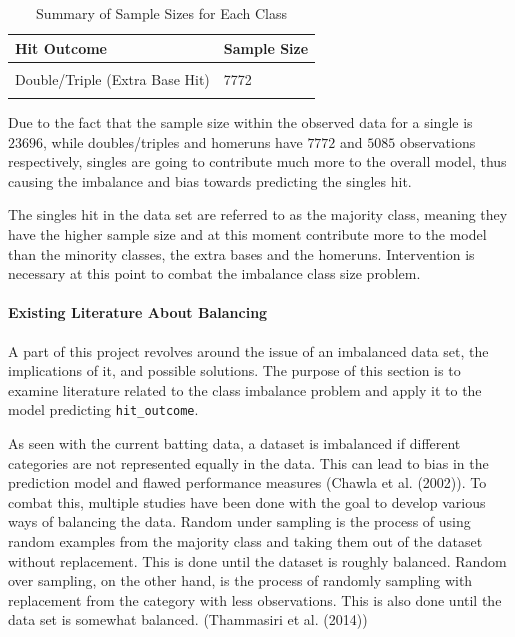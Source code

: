 \documentclass[
  letterpaper,
  DIV=11,
  numbers=noendperiod]{scrartcl}
\let\oldparagraph\paragraph
\renewcommand{\paragraph}[1]{\oldparagraph{#1}\mbox{}}
\begin{document}
\begin{table}[!h]
\centering
\caption{\label{tab:unnamed-chunk-39}Summary of Sample Sizes for Each Class}
\centering
\begin{tabular}[t]{ll}
\toprule
Hit Outcome & Sample Size\\
\midrule
\cellcolor{gray!10}{Single} & \cellcolor{gray!10}{23696}\\
Double/Triple (Extra Base Hit) & 7772\\
\cellcolor{gray!10}{Homerun} & \cellcolor{gray!10}{5085}\\
\bottomrule
\end{tabular}
\end{table}

Due to the fact that the sample size within the observed data for a
single is \(23696\), while doubles/triples and homeruns have \(7772\)
and \(5085\) observations respectively, singles are going to contribute
much more to the overall model, thus causing the imbalance and bias
towards predicting the singles hit.

The singles hit in the data set are referred to as the majority class,
meaning they have the higher sample size and at this moment contribute
more to the model than the minority classes, the extra bases and the
homeruns. Intervention is necessary at this point to combat the
imbalance class size problem.

\paragraph{Existing Literature About
Balancing}\label{existing-literature-about-balancing}

A part of this project revolves around the issue of an imbalanced data
set, the implications of it, and possible solutions. The purpose of this
section is to examine literature related to the class imbalance problem
and apply it to the model predicting \texttt{hit\_outcome}.

As seen with the current batting data, a dataset is imbalanced if
different categories are not represented equally in the data. This can
lead to bias in the prediction model and flawed performance measures
(Chawla et al. (2002)). To combat this, multiple studies have been done
with the goal to develop various ways of balancing the data. Random
under sampling is the process of using random examples from the majority
class and taking them out of the dataset without replacement. This is
done until the dataset is roughly balanced. Random over sampling, on the
other hand, is the process of randomly sampling with replacement from
the category with less observations. This is also done until the data
set is somewhat balanced. (Thammasiri et al. (2014))
\end{document}
